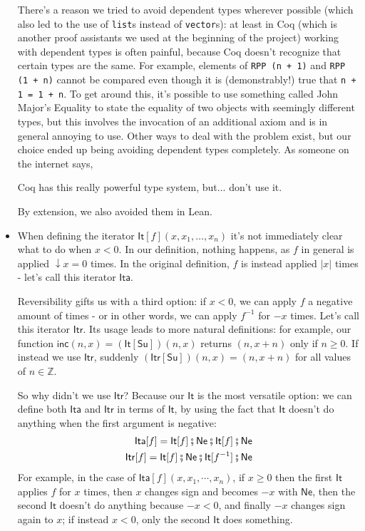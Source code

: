 \documentclass{book}
\theoremstyle{definition}
\theoremstyle{remark}
\theoremstyle{plain}
\newcommand{\Z}{\mathbb{Z}}
\newcommand{\rppNe}{\mathsf{Ne}}
\newcommand{\rppSu}{\mathsf{Su}}
\newcommand{\rppCo}{\fatsemi}
\newcommand{\rppIt}{\mathsf{It}}
\newcommand{\rppIta}{\mathsf{Ita}}
\newcommand{\rppItr}{\mathsf{Itr}}
\newcommand{\rppinc}{\mathsf{inc}}
\begin{document}
\begin{itemize}
There's a reason we tried to avoid dependent types wherever possible
(which also led to the use of \lstinline{list}s instead of \lstinline{vector}s):
at least in Coq (which is another proof assistants we used at the beginning of the project)
working with dependent types is often painful, because Coq doesn't recognize that certain types are the same.
For example, elements of \lstinline{RPP (n + 1)} and \lstinline{RPP (1 + n)} cannot be compared even though it is (demonstrably!) true that
\lstinline{n + 1 = 1 + n}. To get around this, it's possible to use something called John Major's Equality
to state the equality of two objects with seemingly different types,
but this involves the invocation of an additional axiom and is in general annoying to use.
Other ways to deal with the problem exist,
but our choice ended up being avoiding dependent types completely.
As someone on the internet says,
\begin{displayquote}
Coq has this really powerful type system, but... don't use it.
\end{displayquote}
By extension, we also avoided them in Lean.
\item When defining the iterator $\rppIt[f] (x, x_1, \dots, x_n)$ it's not immediately clear what to do when $x < 0$.
In our definition, nothing happens, as $f$ in general is applied $\downarrow x = 0$ times.
In the original definition, $f$ is instead applied $| x |$ times - let's call this iterator $\rppIta$.

Reversibility gifts us with a third option: if $x < 0$,
we can apply $f$ a negative amount of times - or in other words, we can apply $f^{-1}$ for $- x$ times.
Let's call this iterator $\rppItr$.
Its usage leads to more natural definitions:
for example, our function $\rppinc (n, x) = (\rppIt[\rppSu]) (n, x)$ returns $(n, x+n)$ only if $n \ge 0$.
If instead we use $\rppItr$, suddenly $(\rppItr[\rppSu]) (n, x) = (n, x + n)$ for all values of $n \in \Z$.

So why didn't we use $\rppItr$?
Because our $\rppIt$ is the most versatile option:
we can define both $\rppIta$ and $\rppItr$ in terms of $\rppIt$,
by using the fact that $\rppIt$ doesn't do anything when the first argument is negative:
\begin{align*}
  \rppIta[f] = \rppIt[f] \rppCo \rppNe \rppCo \rppIt[f] \rppCo \rppNe \\
  \rppItr[f] = \rppIt[f] \rppCo \rppNe \rppCo \rppIt[f^{-1}] \rppCo \rppNe
\end{align*}
For example, in the case of $\rppIta[f](x,x_1,\cdots,x_n)$, if $x \ge 0$ then the first $\rppIt$ applies $f$ for $x$ times,
then $x$ changes sign and becomes $-x$ with $\rppNe$, then the second $\rppIt$ doesn't do anything because $- x < 0$,
and finally $-x$ changes sign again to $x$; if instead $x < 0$, only the second $\rppIt$ does something.


\end{itemize}
\end{document}
